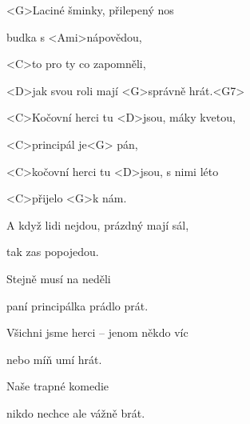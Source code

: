 
\zs
<G>Laciné šminky, přilepený nos

budka s <Ami>nápovědou,

<C>to pro ty co zapomněli,

<D>jak svou roli mají <G>správně hrát.<G7> 
\ks
\zr

<C>Kočovní herci tu <D>jsou, máky kvetou,

<C>principál je<G> pán,

<C>kočovní herci tu <D>jsou, s nimi léto

<C>přijelo <G>k nám.
\kr
\zs

A když lidi nejdou, prázdný mají sál,

tak zas popojedou.

Stejně musí na neděli

paní principálka prádlo prát.

\ks
\zr \kr
\zs


Všichni jsme herci -- jenom někdo víc

nebo míň umí hrát.

Naše trapné komedie

nikdo nechce ale vážně brát.
\ks

\zr
\kr

\kp

